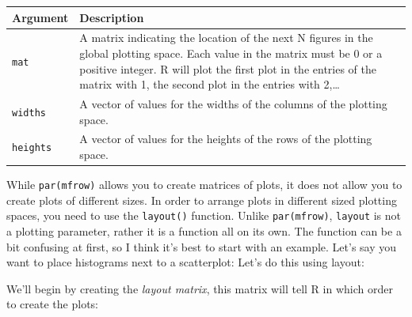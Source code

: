 \documentclass[]{book}
\theoremstyle{definition}
\theoremstyle{definition}
\theoremstyle{remark}
\begin{document}
\begin{longtable}[]{@{}ll@{}}
\toprule
\begin{minipage}[b]{0.18\columnwidth}\raggedright\strut
Argument\strut
\end{minipage} & \begin{minipage}[b]{0.67\columnwidth}\raggedright\strut
Description\strut
\end{minipage}\tabularnewline
\midrule
\endhead
\begin{minipage}[t]{0.18\columnwidth}\raggedright\strut
\texttt{mat}\strut
\end{minipage} & \begin{minipage}[t]{0.67\columnwidth}\raggedright\strut
A matrix indicating the location of the next N figures in the global
plotting space. Each value in the matrix must be 0 or a positive
integer. R will plot the first plot in the entries of the matrix with 1,
the second plot in the entries with 2,\ldots{}\strut
\end{minipage}\tabularnewline
\begin{minipage}[t]{0.18\columnwidth}\raggedright\strut
\texttt{widths}\strut
\end{minipage} & \begin{minipage}[t]{0.67\columnwidth}\raggedright\strut
A vector of values for the widths of the columns of the plotting
space.\strut
\end{minipage}\tabularnewline
\begin{minipage}[t]{0.18\columnwidth}\raggedright\strut
\texttt{heights}\strut
\end{minipage} & \begin{minipage}[t]{0.67\columnwidth}\raggedright\strut
A vector of values for the heights of the rows of the plotting
space.\strut
\end{minipage}\tabularnewline
\bottomrule
\end{longtable}

While \texttt{par(mfrow)} allows you to create matrices of plots, it
does not allow you to create plots of different sizes. In order to
arrange plots in different sized plotting spaces, you need to use the
\texttt{layout()} function. Unlike \texttt{par(mfrow)}, \texttt{layout}
is not a plotting parameter, rather it is a function all on its own. The
function can be a bit confusing at first, so I think it's best to start
with an example. Let's say you want to place histograms next to a
scatterplot: Let's do this using layout:

We'll begin by creating the \emph{layout matrix}, this matrix will tell
R in which order to create the plots:
\end{document}
